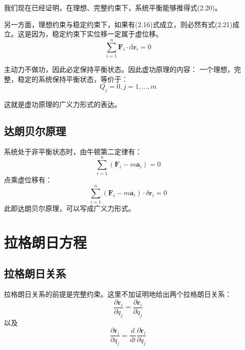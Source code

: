 \documentclass[a4paper, 10pt, openany]{book}%
\begin{document}
   我们现在已经证明，在理想、完整约束下，系统平衡能够推得式(2.20)。

   另一方面，理想约束与稳定约束下，如果有(2.16)式成立，则必然有式(2.21)成立。这是因为，稳定约束下实位移一定属于虚位移。
   \begin{equation}
  \sum_{i=1}^n \textbf{F}_i \cdot\mathrm{d} \textbf{r}_i=0
  \end{equation}
   
   主动力不做功，因此必定保持平衡状态。因此虚功原理的内容：
   一个理想，完整，稳定的系统保持平衡状态，等价于：
   \begin{equation}
    Q_j=0,j=1,\dots,m
   \end{equation}

   这就是虚功原理的广义力形式的表达。
   
   \subsection{达朗贝尔原理}
   系统处于非平衡状态时，由牛顿第二定律有：
   \begin{equation}
    \sum_{i=1}^n (\textbf{F}_i-m\textbf{a}_i)=0
   \end{equation}
    点乘虚位移有：
    \begin{equation}
    \sum_{i=1}^n (\textbf{F}_i-m\textbf{a}_i)\cdot \delta \textbf{r}_i=0
    \end{equation}
    此即达朗贝尔原理，可以写成广义力形式。
    \section{拉格朗日方程}
    \subsection{拉格朗日关系}
    拉格朗日关系的前提是完整约束。这里不加证明地给出两个拉格朗日关系：
    \begin{equation}
        \frac{\partial \textbf{r}_i}{\partial q_j}=\frac{\partial \dot{\textbf{r}}_i}{\partial \dot{q}_j}
    \end{equation}
    以及
    \begin{equation}
        \frac{\partial \dot{\textbf{r}}_i}{\partial q_j}=\frac{d}{dt}\frac{\partial \textbf{r}_i}{\partial q_j}
    \end{equation}
\end{document}
